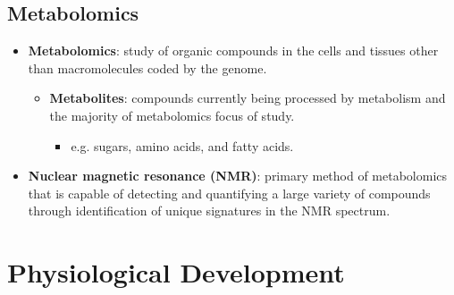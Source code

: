 \documentclass[12pt,a4paper]{article}
\begin{document}
\subsection{Metabolomics}
\begin{itemize}
    \item \textbf{Metabolomics}: study of organic compounds in the cells and tissues other than macromolecules coded by the genome.
        \begin{itemize}
            \item \textbf{Metabolites}: compounds currently being processed by metabolism and the majority of metabolomics focus of study.
                \begin{itemize}
                    \item e.g. sugars, amino acids, and fatty acids.
                \end{itemize}
        \end{itemize}
    \item \textbf{Nuclear magnetic resonance (NMR)}: primary method of metabolomics that is capable of detecting and quantifying a large variety of compounds through identification of unique signatures in the NMR spectrum.
\end{itemize}

\clearpage
\section{Physiological Development}
\end{document}
